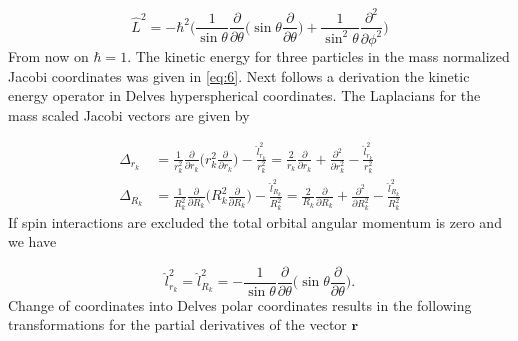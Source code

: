 \documentclass{article}
\numberwithin{equation}{section}
\numberwithin{figure}{section}
\begin{document}
\begin{equation}
\hat{L}^{2} = -\hbar^{2}\Bigg(\frac{1}{\sin{\theta}}\frac{\partial}{\partial \theta} \bigg(\sin{\theta}\frac{\partial}{\partial \theta}\bigg) + \frac{1}{\sin^{2}{\theta}} \frac{\partial^{2}}{\partial \phi^{2}}\Bigg)
\end{equation}
From now on $\hbar = 1$. The kinetic energy for three particles in the mass normalized Jacobi coordinates was given in \eqref{eq:6}. Next follows a derivation the kinetic energy operator in Delves hyperspherical coordinates. The Laplacians for the mass scaled Jacobi vectors are given by

\begin{subequations}
\begin{align}
	\Delta_{r_{k}} &= \frac{1}{r_{k}^2}\frac{\partial}{\partial r_{k}} \bigg( r_{k}^2 \frac{\partial}{\partial r_{k}} \bigg) - \frac{\hat{l}^2_{r_k}}{r_{k}^2} = \frac{2}{r_{k}}\frac{\partial}{\partial r_{k}} + \frac{\partial^2}{\partial r_{k}^{2}} - \frac{\hat{l}^{2}_{r_k}}{r_{k}^2}\\
	\Delta_{R_{k}} &= \frac{1}{R_{k}^2}\frac{\partial}{\partial R_{k}} \bigg( R_{k}^2 \frac{\partial}{\partial R_{k}} \bigg) - \frac{\hat{l}^2_{R_k}}{R_{k}^2} = \frac{2}{R_{k}}\frac{\partial}{\partial R_{k}} + \frac{\partial^2}{\partial R_{k}^{2}} - \frac{\hat{l}^{2}_{R_k}}{R_{k}^2}
\end{align}
\end{subequations}
If spin interactions are excluded the total orbital angular momentum is zero and we have 

\begin{equation}
\hat{l}^{2}_{r_k} = \hat{l}^{2}_{R_k} = -\frac{1}{\sin{\theta}} \frac{\partial}{\partial{\theta}} \bigg( \sin{\theta} \frac{\partial}{\partial{\theta}} \bigg).
\end{equation}
Change of coordinates into Delves polar coordinates results in the following transformations for the partial derivatives of the vector $\mathbf{r}$
\end{document}
